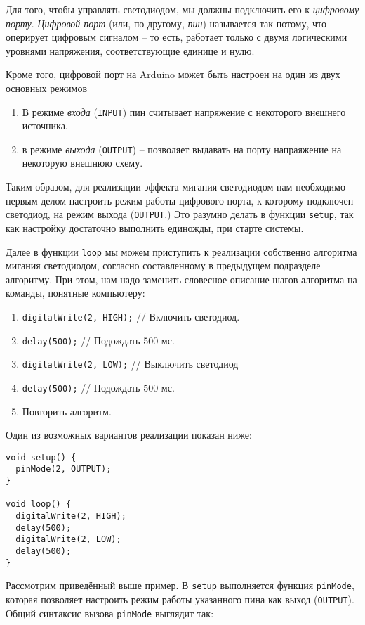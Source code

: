 \documentclass[../sparc.tex]{subfiles}
\begin{document}
Для того, чтобы управлять светодиодом, мы должны подключить его к
\emph{цифровому порту}.  \emph{Цифровой порт} (или, по-другому, \emph{пин})
называется так потому, что оперирует цифровым сигналом -- то есть, работает
только с двумя логическими уровнями напряжения, соответствующие единице и нулю.

Кроме того, цифровой порт на Arduino может быть настроен на один из двух
основных режимов
\begin{enumerate}
\item В режиме \emph{входа} (\texttt{INPUT}) пин считывает напряжение с
  некоторого внешнего источника.
\item в режиме \emph{выхода} (\texttt{OUTPUT}) – позволяет выдавать на порту
  напраяжение на некоторую внешнюю схему.
\end{enumerate}

Таким образом, для реализации эффекта мигания светодиодом нам необходимо первым
делом настроить режим работы цифрового порта, к которому подключен светодиод, на
режим выхода (\texttt{OUTPUT}.)  Это разумно делать в функции \texttt{setup},
так как настройку достаточно выполнить единожды, при старте системы.

Далее в функции \texttt{loop} мы можем приступить к реализации собственно
алгоритма мигания светодиодом, согласно составленному в предыдущем подразделе
алгоритму.  При этом, нам надо заменить словесное описание шагов алгоритма на
команды, понятные компьютеру:

\begin{enumerate}
\item \texttt{digitalWrite(2, HIGH);} // Включить светодиод.
\item \texttt{delay(500);} // Подождать 500 мс.
\item \texttt{digitalWrite(2, LOW);} // Выключить светодиод
\item \texttt{delay(500);} // Подождать 500 мс.
\item Повторить алгоритм.
\end{enumerate}

Один из возможных вариантов реализации показан ниже:

\begin{verbatim}
void setup() {
  pinMode(2, OUTPUT);
}

void loop() {
  digitalWrite(2, HIGH);
  delay(500);
  digitalWrite(2, LOW);
  delay(500);
}
\end{verbatim}

Рассмотрим приведённый выше пример.  В \texttt{setup} выполняется функция
\texttt{pinMode}, которая позволяет настроить режим работы указанного пина как
выход (\texttt{OUTPUT}).  Общий синтаксис вызова \texttt{pinMode} выглядит так:
\end{document}
